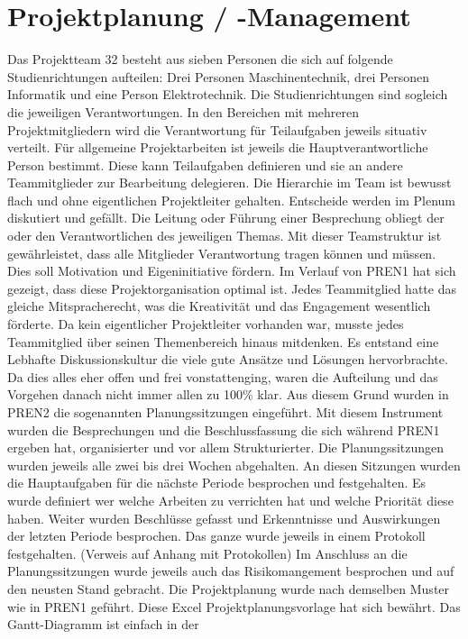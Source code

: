 \section{Projektplanung / -Management}

Das Projektteam 32 besteht aus sieben Personen die sich auf folgende 
Studienrichtungen aufteilen: Drei Personen Maschinentechnik, drei 
Personen Informatik und eine Person Elektrotechnik. Die Studienrichtungen 
sind sogleich die jeweiligen Verantwortungen. In den Bereichen mit mehreren Projektmitgliedern wird die Verantwortung für Teilaufgaben jeweils 
situativ verteilt. Für allgemeine Projektarbeiten ist jeweils die 
Hauptverantwortliche Person bestimmt. Diese kann Teilaufgaben definieren 
und sie an andere Teammitglieder zur Bearbeitung delegieren. Die Hierarchie 
im Team ist bewusst flach und ohne eigentlichen Projektleiter gehalten. 
Entscheide werden im Plenum diskutiert und gefällt. Die Leitung oder Führung 
einer Besprechung obliegt der oder den Verantwortlichen des jeweiligen Themas. 
Mit dieser Teamstruktur ist gewährleistet, dass alle Mitglieder Verantwortung 
tragen können und müssen. Dies soll Motivation und Eigeninitiative fördern. 
Im Verlauf von PREN1 hat sich gezeigt, dass diese Projektorganisation optimal 
ist. Jedes Teammitglied hatte das gleiche Mitspracherecht, was die Kreativität 
und das Engagement wesentlich förderte. Da kein eigentlicher Projektleiter 
vorhanden war, musste jedes Teammitglied über seinen Themenbereich hinaus 
mitdenken. Es entstand eine Lebhafte Diskussionskultur die viele gute Ansätze 
und Lösungen hervorbrachte. Da dies alles eher offen und frei vonstattenging, 
waren die Aufteilung und das Vorgehen danach nicht immer allen zu 100\% klar. 
Aus diesem Grund wurden in PREN2 die sogenannten Planungssitzungen eingeführt. 
Mit diesem Instrument wurden die Besprechungen und die Beschlussfassung die 
sich während PREN1 ergeben hat, organisierter und vor allem Strukturierter. Die 
Planungssitzungen wurden jeweils alle zwei bis drei Wochen abgehalten. An diesen 
Sitzungen wurden die Hauptaufgaben für die nächste Periode besprochen und 
festgehalten. Es wurde definiert wer welche Arbeiten zu verrichten hat und welche 
Priorität diese haben. Weiter wurden Beschlüsse gefasst und Erkenntnisse und 
Auswirkungen der letzten Periode besprochen. Das ganze wurde jeweils in einem 
Protokoll festgehalten. (Verweis auf Anhang mit Protokollen) Im Anschluss an die Planungssitzungen wurde jeweils auch das Risikomangement besprochen und auf den 
neusten Stand gebracht. 
Die Projektplanung wurde nach demselben Muster wie in PREN1 geführt. Diese Excel Projektplanungsvorlage hat sich bewährt. Das Gantt-Diagramm ist einfach in der 
